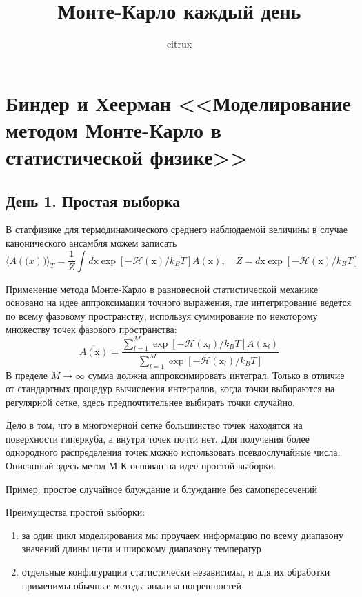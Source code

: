 \documentclass[article]{ncc}
\author{citrux}
\title{Монте-Карло каждый день}
\renewcommand{\vec}[1]{\boldsymbol{\mathrm{#1}}}
\begin{document}
\maketitle
\onehalfspacing

\section{Биндер и Хеерман <<Моделирование методом Монте-Карло в статистической физике>>}
\subsection{День 1. Простая выборка}

В статфизике для термодинамического среднего наблюдаемой величины в случае канонического ансамбля можем записать
\begin{equation}
    \langle A(\vec(x)) \rangle_T = \frac{1}{Z}\int d\vec{x} \exp[-\mathcal{H}(\vec{x})/k_BT]A(\vec{x}),
    \quad Z=d\vec{x} \exp[-\mathcal{H}(\vec{x})/k_BT]
\end{equation}

Применение метода Монте-Карло в равновесной статистической механике основано на идее аппроксимации точного выражения, где интегрирование ведется по всему фазовому пространству, используя суммирование по некоторому множеству точек фазового пространства:
\begin{equation}
\overline{A(\vec{x})}=\frac{\sum\limits_{l=1}^{M} \exp[-\mathcal{H}(\vec{x}_l)/k_BT]A(\vec{x}_l)}
                              {\sum\limits_{l=1}^{M} \exp[-\mathcal{H}(\vec{x}_l)/k_BT]}
\end{equation}
В пределе \(M \to \infty\) сумма должна аппроксимировать интеграл.
Только в отличие от стандартных процедур вычисления интегралов, когда точки выбираются на регулярной сетке, здесь предпочтительнее выбирать точки случайно.

Дело в том, что в многомерной сетке большинство точек находятся на поверхности гиперкуба, а внутри точек почти нет. Для получения более однородного распределения точек можно использовать псевдослучайные числа. Описанный здесь метод М-К основан на идее простой выборки.

Пример: простое случайное блуждание и блуждание без самопересечений

Преимущества простой выборки:
\begin{enumerate}
    \item за один цикл моделирования мы проучаем информацию по всему диапазону значений длины цепи и широкому диапазону температур
    \item отдельные конфигурации статистически независимы, и для их обработки применимы обычные методы анализа погрешностей
\end{enumerate}
\end{document}
